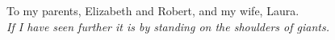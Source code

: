 
\cleartorecto %
\thispagestyle{plain} %

\begin{vplace}[0.7]
\begin{center}
  To my parents, Elizabeth and Robert, and my wife, Laura. \\
  \textit{If I have seen further it is by standing on the shoulders of giants.}
\end{center}
\end{vplace}